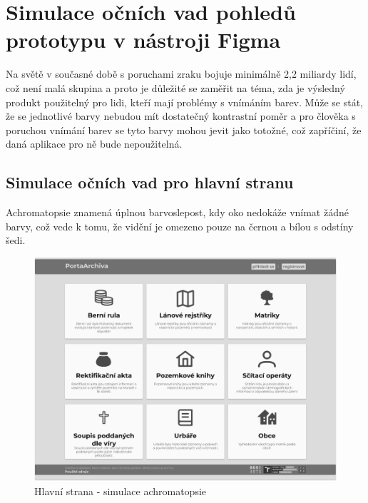 \chapter{Simulace očních vad pohledů prototypu v nástroji Figma}
\label{appendix:simulations-of-eye-defects}
\noindent
Na světě v současné době s poruchami zraku bojuje minimálně 2,2 miliardy lidí, \cite{WorldReportOnVision} což není malá skupina a proto je důležité se zaměřit na téma, zda je výsledný produkt použitelný pro lidi, kteří mají problémy s vnímáním barev. Může se stát, že se jednotlivé barvy nebudou mít dostatečný kontrastní poměr a pro člověka s poruchou vnímání barev se tyto barvy mohou jevit jako totožné, což zapříčiní, že daná aplikace pro ně bude nepoužitelná.

\section{Simulace očních vad pro hlavní stranu}
\noindent
Achromatopsie znamená úplnou barvoslepost, kdy oko nedokáže vnímat žádné barvy, což vede k tomu, že vidění je omezeno pouze na černou a bílou s odstíny šedi.
\begin{figure}[htbp]
\centering
    \includegraphics[scale=.35]{obrazky-figures/testing/figma-eye-defects/Main - Achromatopsia.png}
    \caption{Hlavní strana - simulace achromatopsie}
\end{figure}

